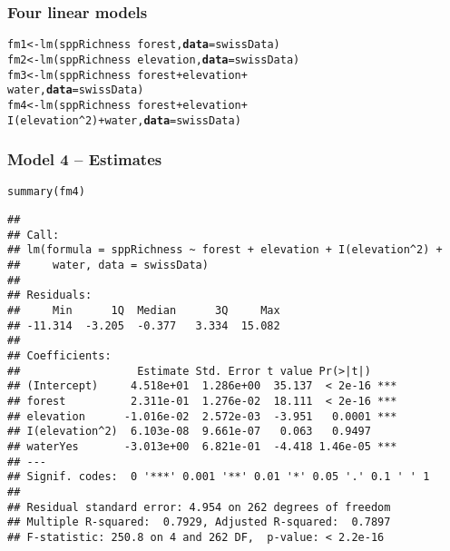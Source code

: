 \documentclass[color=usenames,dvipsnames]{beamer}\usepackage[]{graphicx}\usepackage[]{color}
\makeatletter
\newcommand{\hlnum}[1]{\textcolor[rgb]{0.69,0.494,0}{#1}}%
\newcommand{\hlopt}[1]{\textcolor[rgb]{0,0,0}{#1}}%
\newcommand{\hlstd}[1]{\textcolor[rgb]{0,0,0}{#1}}%
\newcommand{\hlkwb}[1]{\textcolor[rgb]{0,0.341,0.682}{#1}}%
\newcommand{\hlkwc}[1]{\textcolor[rgb]{0,0,0}{\textbf{#1}}}%
\newcommand{\hlkwd}[1]{\textcolor[rgb]{0.004,0.004,0.506}{#1}}%
\newenvironment{kframe}{%
 \def\at@end@of@kframe{}%
 \ifinner\ifhmode%
  \def\at@end@of@kframe{\end{minipage}}%
  \begin{minipage}{\columnwidth}%
 \fi\fi%
 \def\FrameCommand##1{\hskip\@totalleftmargin \hskip-\fboxsep
 \colorbox{shadecolor}{##1}\hskip-\fboxsep
     \hskip-\linewidth \hskip-\@totalleftmargin \hskip\columnwidth}%
 \MakeFramed {\advance\hsize-\width
   \@totalleftmargin\z@ \linewidth\hsize
   \@setminipage}}%
 {\par\unskip\endMakeFramed%
 \at@end@of@kframe}
\newenvironment{knitrout}{}{} %
\makeatother
\begin{document}
\begin{frame}[fragile]
  \frametitle{Four linear models}
\begin{knitrout}
\color{fgcolor}\begin{kframe}
\begin{alltt}
\hlstd{fm1} \hlkwb{<-} \hlkwd{lm}\hlstd{(sppRichness} \hlopt{~} \hlstd{forest,} \hlkwc{data}\hlstd{=swissData)}
\hlstd{fm2} \hlkwb{<-} \hlkwd{lm}\hlstd{(sppRichness} \hlopt{~} \hlstd{elevation,} \hlkwc{data}\hlstd{=swissData)}
\hlstd{fm3} \hlkwb{<-} \hlkwd{lm}\hlstd{(sppRichness} \hlopt{~} \hlstd{forest} \hlopt{+} \hlstd{elevation} \hlopt{+}
          \hlstd{water,} \hlkwc{data}\hlstd{=swissData)}
\hlstd{fm4} \hlkwb{<-} \hlkwd{lm}\hlstd{(sppRichness} \hlopt{~} \hlstd{forest} \hlopt{+} \hlstd{elevation} \hlopt{+}
          \hlkwd{I}\hlstd{(elevation}\hlopt{^}\hlnum{2}\hlstd{)} \hlopt{+} \hlstd{water,} \hlkwc{data}\hlstd{=swissData)}
\end{alltt}
\end{kframe}
\end{knitrout}
\end{frame}



\begin{frame}[fragile]
  \frametitle{Model 4 -- Estimates}
  \vspace{-5pt}
\begin{knitrout}\scriptsize
{}\color{fgcolor}\begin{kframe}
\begin{alltt}
\hlkwd{summary}\hlstd{(fm4)}
\end{alltt}
\begin{verbatim}
## 
## Call:
## lm(formula = sppRichness ~ forest + elevation + I(elevation^2) + 
##     water, data = swissData)
## 
## Residuals:
##     Min      1Q  Median      3Q     Max 
## -11.314  -3.205  -0.377   3.334  15.082 
## 
## Coefficients:
##                  Estimate Std. Error t value Pr(>|t|)    
## (Intercept)     4.518e+01  1.286e+00  35.137  < 2e-16 ***
## forest          2.311e-01  1.276e-02  18.111  < 2e-16 ***
## elevation      -1.016e-02  2.572e-03  -3.951   0.0001 ***
## I(elevation^2)  6.103e-08  9.661e-07   0.063   0.9497    
## waterYes       -3.013e+00  6.821e-01  -4.418 1.46e-05 ***
## ---
## Signif. codes:  0 '***' 0.001 '**' 0.01 '*' 0.05 '.' 0.1 ' ' 1
## 
## Residual standard error: 4.954 on 262 degrees of freedom
## Multiple R-squared:  0.7929,	Adjusted R-squared:  0.7897 
## F-statistic: 250.8 on 4 and 262 DF,  p-value: < 2.2e-16
\end{verbatim}
\end{kframe}
\end{knitrout}
\end{frame}
\end{document}
